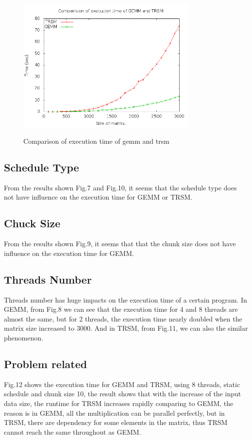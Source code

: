 \documentclass{article}
\begin{document}
    \begin{figure}[th!]
        \centering
        \includegraphics[width=0.8\textwidth]{static_ck10_8_trsm.png}
        \label{fig:12}
        \caption{Comparison of execution time of gemm and trsm}
    \end{figure}

\subsection{Schedule Type}
From the results shown Fig.7 and Fig.10, it seems that the schedule type does not have influence on the execution 
time for GEMM or TRSM. 
\subsection{Chuck Size}
From the results shown Fig.9, it seems that that the chunk size does not have influence on the execution 
time for GEMM. 
\subsection{Threads Number}
Threads number has huge impacts on the execution time of a certain program. In GEMM, from Fig.8 we can see that the
execution time for 4 and 8 threads are almost the same, but for 2 threads, the execution time nearly doubled when the 
matrix size increased to 3000. And in TRSM, from Fig.11, we can also the similar phenomenon.
\subsection{Problem related}
Fig.12 shows the execution time for GEMM and TRSM, using 8 threads, static schedule and chunk size 10, the result
shows that with the increase of the input data size, the runtime for TRSM increases rapidly comparing to GEMM, the 
reason is in GEMM, all the multiplication can be parallel perfectly, but in TRSM, there are dependency for some elements
in the matrix, thus TRSM cannot reach the same throughout as GEMM.
\end{document}
